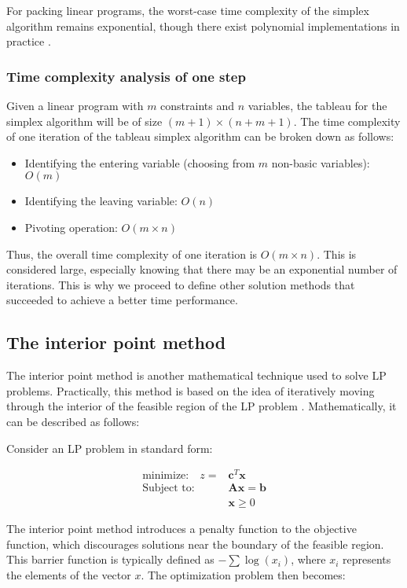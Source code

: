 For packing linear programs, the worst-case time complexity of the simplex algorithm remains exponential, though there exist polynomial implementations in practice \parencite{stille2010solution}.

\subsubsection{Time complexity analysis of one step}
Given a linear program with \( m \) constraints and \( n \) variables, the tableau for the
simplex algorithm will be of size \( (m+1) \times (n+m+1) \).
The time complexity of one iteration of the tableau simplex algorithm can be broken down as follows:

\begin{itemize}
    \item Identifying the entering variable (choosing from $m$ non-basic variables): \( O(m) \)
    \item Identifying the leaving variable: \( O(n) \)
    \item Pivoting operation: \( O(m \times n) \)
\end{itemize}

Thus, the overall time complexity of one iteration is \( O(m \times n) \). This is considered large, especially knowing that there may be an exponential number of iterations. This is why we proceed to define other solution methods that succeeded to achieve a better time performance.

\subsection{The interior point method}
The interior point method is another mathematical technique used to solve LP problems. Practically, this method is based on the idea of iteratively moving through the interior of the feasible region of the LP problem \parencite{alizadeh1995interior}. Mathematically, it can be described as follows:

Consider an LP problem in standard form:

\[
    \begin{aligned}
        \text{minimize:} \quad   z = & \mathbf{c}^T\mathbf{x}   \\
        \text{Subject to:} \quad     & \mathbf{Ax} = \mathbf{b} \\
                                     & \mathbf{x} \geq 0
    \end{aligned}
\]

The interior point method introduces a penalty function to the objective function, which discourages solutions near the boundary of the feasible region. This barrier function is typically defined as $-\sum \log(x_i)$, where $x_i$ represents the elements of the vector $x$.
The optimization problem then becomes:

